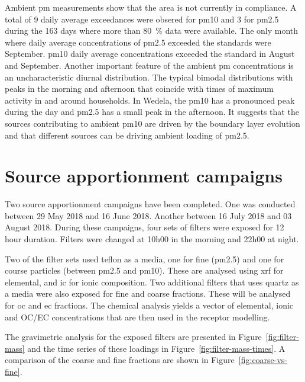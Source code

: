 \documentclass{nwureport}
\begin{document}
Ambient \gls{pm} measurements show that the area is not currently in compliance. A total of 9 daily average exceedances were obsered for \gls{pm10} and 3 for \gls{pm2.5} during the 163 days where more than \SI{80}{\percent} data were available. The only month where daily average concentrations of \gls{pm2.5} exceeded the standards were September. \gls{pm10} daily average concentrations exceeded the standard in August and September. Another important feature of the ambient \gls{pm} concentrations is an uncharacteristic diurnal distribution. The typical bimodal distributions with peaks in the morning and afternoon that coincide with times of maximum activity in and around households. In Wedela, the \gls{pm10} has a pronounced peak during the day and \gls{pm2.5} has a small peak in the afternoon. It suggests that the sources contributing to ambient \gls{pm10} are driven by the boundary layer evolution and that different sources can be driving ambient loading of \gls{pm2.5}.


\chapter{Source apportionment campaigns}
\label{sec:source}

Two source apportionment campaigns have been completed. One was conducted between 29 May 2018 and 16 June 2018. Another between 16 July 2018 and 03 August 2018. During these campaigns, four sets of filters were exposed for 12 hour duration. Filters were changed at 10h00 in the morning and 22h00 at night.

Two of the filter sets used teflon as a media, one for fine (\gls{pm2.5}) and one for course particles (between \gls{pm2.5} and \gls{pm10}). These are analysed using \gls{xrf} for elemental, and \gls{ic} for ionic composition. Two additional filters that uses quartz as a media were also exposed for fine and coarse fractions. These will be analysed for \gls{oc} and \gls{ec} fractions. The chemical analysis yields a vector of elemental, ionic and OC/EC concentrations that are then used in the receptor modelling.

The gravimetric analysis for the exposed filters are presented in Figure~\ref{fig:filter-mass} and the time series of these loadings in Figure~\ref{fig:filter-mass-times}. A comparison of the coarse and fine fractions are shown in Figure~\ref{fig:coarse-vs-fine}.
\end{document}

